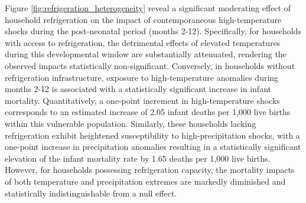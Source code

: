 \documentclass[a4paper]{article}
\begin{document}
Figure \ref{fig:refrigeration_heterogeneity} reveal a significant moderating effect of household refrigeration on the impact of contemporaneous high-temperature shocks during the post-neonatal period (months 2-12). Specifically, for households with access to refrigeration, the detrimental effects of elevated temperatures during this developmental window are substantially attenuated, rendering the observed impacts statistically non-significant. Conversely, in households without refrigeration infrastructure, exposure to high-temperature anomalies during months 2-12 is associated with a statistically significant increase in infant mortality. Quantitatively, a one-point increment in high-temperature shocks corresponds to an estimated increase of 2.05 infant deaths per 1,000 live births within this vulnerable population. Similarly, these households lacking refrigeration exhibit heightened susceptibility to high-precipitation shocks, with a one-point increase in precipitation anomalies resulting in a statistically significant elevation of the infant mortality rate by 1.65 deaths per 1,000 live births. However, for households possessing refrigeration capacity, the mortality impacts of both temperature and precipitation extremes are markedly diminished and statistically indistinguishable from a null effect. 
\end{document}
